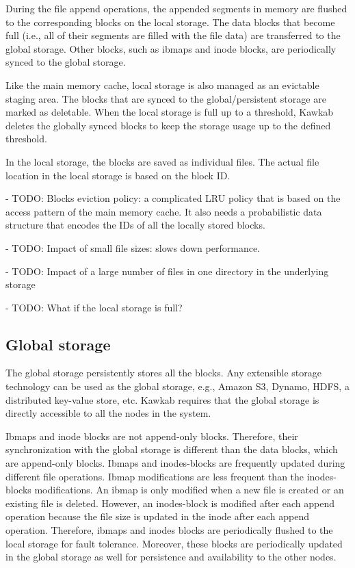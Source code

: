 \documentclass[]{article}
\begin{document}
During the file append operations, the appended segments in memory are flushed
to the corresponding blocks on the local storage.  The data blocks that become
full (i.e., all of their segments are filled with the file data)
are transferred to the global storage.  Other blocks, such as ibmaps and
inode blocks, are periodically synced to the global storage.

Like the main memory cache, local storage is also managed as an evictable
staging area. The blocks that are synced to the global/persistent storage are
marked as deletable. When the local storage is full up to a threshold, Kawkab
deletes the globally synced blocks to keep the storage usage up to
the defined threshold.

In the local storage, the blocks are saved as individual files. The actual
file location in the local storage is based on the block ID.

- TODO: Blocks eviction policy: a complicated LRU policy that is based on the
  access pattern of the main memory cache. It also needs a probabilistic
  data structure that encodes the IDs of all the locally stored blocks.

- TODO: Impact of small file sizes: slows down performance.

- TODO: Impact of a large number of files in one directory in the underlying storage

- TODO: What if the local storage is full?


\subsection{Global storage}

The global storage persistently stores all the blocks. Any extensible storage
technology can be used as the global storage, e.g., Amazon S3, Dynamo, HDFS, a
distributed key-value store, etc.  Kawkab requires that the global storage is
directly accessible to all the nodes in the system.

Ibmaps and inode blocks are not append-only blocks. Therefore, their
synchronization with the global storage is different than the data blocks,
which are append-only blocks. Ibmaps and inodes-blocks are frequently updated
during different file operations. Ibmap modifications are less frequent than
the inodes-blocks modifications. An ibmap is only modified when a new file is
created or an existing file is deleted.  However, an inodes-block is modified
after each append operation because the file size is updated in
the inode after each append operation. Therefore, ibmaps and inodes blocks are
periodically flushed to the local storage for fault tolerance.  Moreover, these
blocks are periodically updated in the global storage as well for persistence
and availability to the other nodes.
\end{document}
